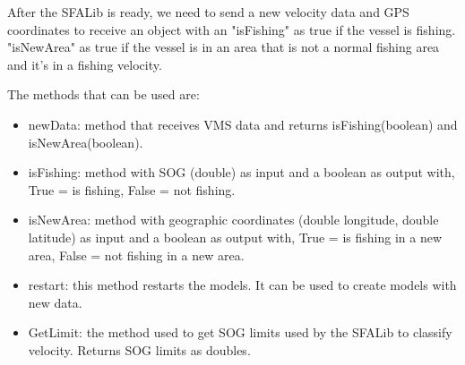 After the SFALib is ready, we need to send a new velocity data and GPS coordinates to receive an object with an "isFishing" as true if the vessel is fishing. "isNewArea" as true if the vessel is in an area that is not a normal fishing area and it's in a fishing velocity.

The methods that can be used are:
\begin{itemize}
\item newData: method that receives VMS data and returns isFishing(boolean) and isNewArea(boolean).
\item isFishing: method with SOG (double) as input and a boolean as output with, True = is fishing, False = not fishing.
\item isNewArea: method with geographic coordinates (double longitude, double latitude) as input and a boolean as output with, True = is fishing in a new area, False = not fishing in a new area.
\item restart: this method restarts the models. It can be used to create models with new data.
\item GetLimit: the method used to get SOG limits used by the SFALib to classify velocity. Returns SOG limits as doubles.
\end{itemize}







